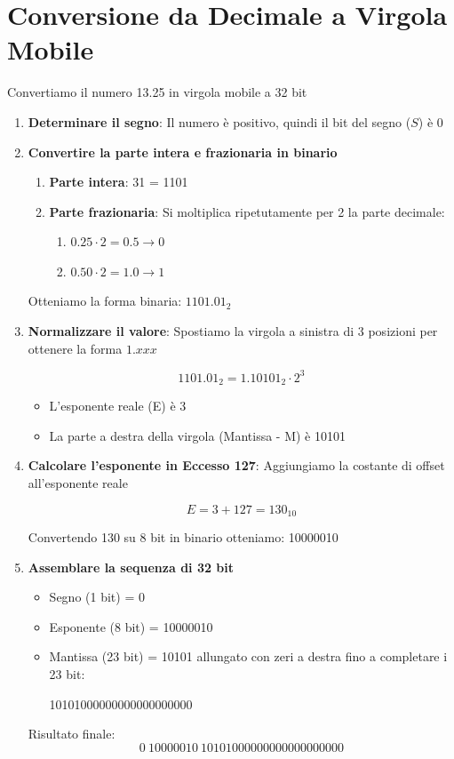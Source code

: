 \section{Conversione da Decimale a Virgola Mobile}

Convertiamo il numero 13.25 in virgola mobile a 32 bit

\begin{enumerate}
    \item \textbf{Determinare il segno}: Il numero è positivo, quindi il bit del segno ($S$) è 0
    \item \textbf{Convertire la parte intera e frazionaria in binario}
    \begin{enumerate}
        \item \textbf{Parte intera}: 31 = 1101
        \item \textbf{Parte frazionaria}: Si moltiplica ripetutamente per 2 la parte decimale:
        \begin{enumerate}
            \item $0.25 \cdot 2 = 0.5 \to 0$
            \item $0.50 \cdot 2 = 1.0 \to 1$
        \end{enumerate}
    \end{enumerate}
    Otteniamo la forma binaria: $1101.01_2$

        \item \textbf{Normalizzare il valore}: Spostiamo la virgola a sinistra di 3 posizioni per ottenere la forma $1.xxx$

        $$
            1101.01_2 = 1.10101_2 \cdot 2^3
        $$

        \begin{itemize}
            \item L'esponente reale (E) è 3
            \item La parte a destra della virgola (Mantissa - M) è 10101
        \end{itemize}

    \item \textbf{Calcolare l'esponente in Eccesso 127}: Aggiungiamo la costante di offset all'esponente reale

    $$
        E = 3 + 127 = 130_10
    $$
    
    Convertendo 130 su 8 bit in binario otteniamo: 10000010

    \item \textbf{Assemblare la sequenza di 32 bit}
    \begin{itemize}
        \item Segno (1 bit) = 0
        \item Esponente (8 bit) = 10000010
        \item Mantissa (23 bit) = 10101 allungato con zeri a destra fino a completare i 23 bit: 
        
        10101000000000000000000
    \end{itemize}
    Risultato finale:
    $$
        0\ 10000010\ 10101000000000000000000     
    $$
\end{enumerate}

